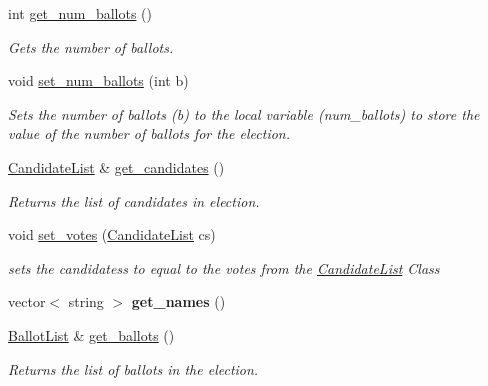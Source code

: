 \begin{DoxyCompactItemize}
\mbox{\label{class_election_a99f8cd6773f5c046b975eb39109cd123}} 
int \mbox{\hyperlink{class_election_a99f8cd6773f5c046b975eb39109cd123}{get\+\_\+num\+\_\+ballots}} ()
\begin{DoxyCompactList}\small\item\em Gets the number of ballots. \end{DoxyCompactList}\item 
void \mbox{\hyperlink{class_election_ae8f4cc654d20ae3677f01584a62d33d0}{set\+\_\+num\+\_\+ballots}} (int b)
\begin{DoxyCompactList}\small\item\em Sets the number of ballots (b) to the local variable (num\+\_\+ballots) to store the value of the number of ballots for the election. \end{DoxyCompactList}\item 
\mbox{\label{class_election_abb17fd9395b0931c5f635c2c0dd30427}} 
\mbox{\hyperlink{class_candidate_list}{Candidate\+List}} \& \mbox{\hyperlink{class_election_abb17fd9395b0931c5f635c2c0dd30427}{get\+\_\+candidates}} ()
\begin{DoxyCompactList}\small\item\em Returns the list of candidates in election. \end{DoxyCompactList}\item 
void \mbox{\hyperlink{class_election_a726cbdaaca392d54675954d6d86f10f0}{set\+\_\+votes}} (\mbox{\hyperlink{class_candidate_list}{Candidate\+List}} cs)
\begin{DoxyCompactList}\small\item\em sets the candidatess to equal to the votes from the \mbox{\hyperlink{class_candidate_list}{Candidate\+List}} Class \end{DoxyCompactList}\item 
\mbox{\label{class_election_a0100bf20e0c74b160867ac15d814a406}} 
vector$<$ string $>$ {\bfseries get\+\_\+names} ()
\item 
\mbox{\label{class_election_aff53e44590e75eabca7ca1f10f287c2a}} 
\mbox{\hyperlink{class_ballot_list}{Ballot\+List}} \& \mbox{\hyperlink{class_election_aff53e44590e75eabca7ca1f10f287c2a}{get\+\_\+ballots}} ()
\begin{DoxyCompactList}\small\item\em Returns the list of ballots in the election. \end{DoxyCompactList}\item 

\end{DoxyCompactItemize}
